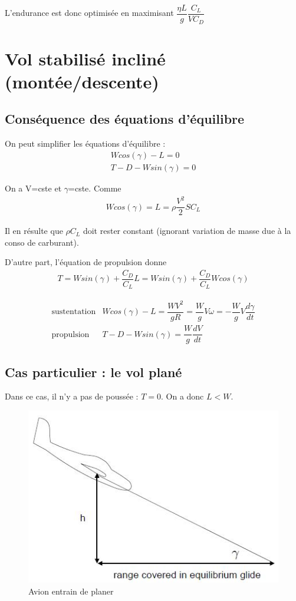 \documentclass{report}
\begin{document}
L'endurance est donc optimisée en maximisant $\dfrac{\eta L}{g}\dfrac{C_L}{VC_D}$

\section{Vol stabilisé incliné (montée/descente)}
\subsection{Conséquence des équations d'équilibre}

On peut simplifier les équations d'équilibre :
\begin{eqnarray}
W cos(\gamma)-L=0\\
T-D-W sin(\gamma)=0
\end{eqnarray}

On a V=cste et $\gamma$=cste. Comme
\begin{eqnarray}
W cos(\gamma)=L=\rho\dfrac{V^2}{2}SC_L
\end{eqnarray}

Il en résulte que $\rho C_L$ doit rester constant (ignorant variation de masse due à la conso de carburant).

D'autre part, l'équation de propulsion donne
\begin{eqnarray}
T=W sin(\gamma)+\dfrac{C_D}{C_L}L=W sin(\gamma)+\dfrac{C_D}{C_L}Wcos(\gamma)
\end{eqnarray}

\begin{eqnarray}
\text{sustentation} & Wcos(\gamma)-L=\dfrac{W V^2}{gR}=\dfrac{W}{g}V\omega = -\dfrac{W}{g}V\dfrac{d\gamma}{dt}\\
\text{propulsion} & T-D-W sin(\gamma) = \dfrac{W}{g}\dfrac{dV}{dt}
\end{eqnarray}

\subsection{Cas particulier : le vol plané}

Dans ce cas, il n'y a pas de poussée : $T=0$. On a donc $L<W$.

\begin{figure}[h!]
    \centering
    \includegraphics[scale=0.7]{12.JPG}
    \caption{Avion entrain de planer}
    \label{12}
\end{figure}
\end{document}
